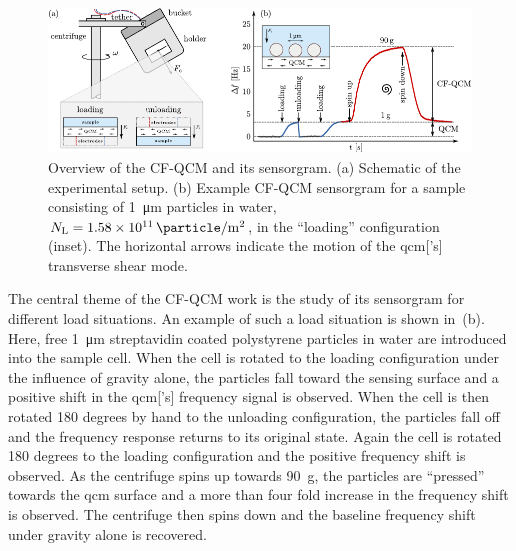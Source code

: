 \begin{figure}[ht]
  \centering
  \includegraphics[width=16cm,keepaspectratio]{qcm/figures/figure1.pdf}
  \caption{Overview of the CF-QCM and its sensorgram.  (a) Schematic of the
    experimental setup.  (b) Example CF-QCM sensorgram
    for a sample consisting of \SI{1}{\micro\meter} particles in water,
    $N_\mathrm{L}=\SI{1.58e11}{\particle\per\meter\squared}$, in the
    ``loading'' configuration (inset).  The horizontal arrows indicate the
    motion of the \gls{qcm}['s] transverse shear mode.  }
  \label{fig:expsetup}
\end{figure}
The central theme of the CF-QCM work is the study of its sensorgram for
different load situations.  An example of such a load situation is shown in
\,(b).  Here, free \SI{1}{\micro\meter} streptavidin
coated polystyrene particles in water are introduced into the sample cell.
When the cell is rotated to the loading configuration under the influence
of gravity alone, the particles fall toward the sensing surface and a
positive shift in the \gls{qcm}['s] frequency signal is observed.  When the cell is
then rotated 180 degrees by hand to the unloading configuration, the
particles fall off and the frequency response returns to its original
state.  Again the cell is rotated 180 degrees to the loading configuration
and the positive frequency shift is observed.  As the centrifuge spins up
towards \SI{90}{g}, the particles are ``pressed'' towards the \gls{qcm} surface
and a more than four fold increase in the frequency shift is observed.  The
centrifuge then spins down and the baseline frequency shift under gravity
alone is recovered.

